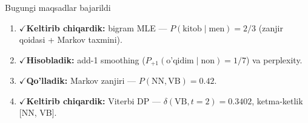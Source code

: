 \documentclass[aspectratio=169,11pt]{beamer}
\newcommand{\bajarildi}{{\color{deepgreen}\large$\checkmark$}\;}
\begin{document}
\begin{frame}{Bugungi maqsadlar bajarildi}
  \begin{enumerate}\setlength\itemsep{7pt}
    \item \bajarildi \textbf{Keltirib chiqardik:} bigram MLE ---
          $P(\text{kitob}{\mid}\text{men})=2/3$ (zanjir qoidasi + Markov taxmini).
    \item \bajarildi \textbf{Hisobladik:} add-1 smoothing
          ($P_{+1}(\text{o'qidim}{\mid}\text{non})=1/7$) va perplexity.
    \item \bajarildi \textbf{Qo'lladik:} Markov zanjiri ---
          $P(\text{NN},\text{VB})=0.42$.
    \item \bajarildi \textbf{Keltirib chiqardik:} Viterbi DP ---
          $\delta(\text{VB},t{=}2)=0.3402$, ketma-ketlik [NN, VB].
  \end{enumerate}
\end{frame}
\end{document}
